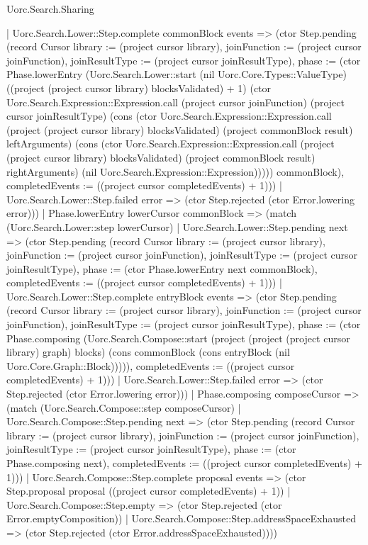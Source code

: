 \begin{lexlean}{Uorc.Search.Sharing}
\begin{semanticmodule}
{      | Uorc.Search.Lower::Step.complete commonBlock events => (ctor Step.pending (record Cursor {library := (project cursor library), joinFunction := (project cursor joinFunction), joinResultType := (project cursor joinResultType), phase := (ctor Phase.lowerEntry (Uorc.Search.Lower::start (nil Uorc.Core.Types::ValueType) ((project (project cursor library) blocksValidated) + 1) (ctor Uorc.Search.Expression::Expression.call (project cursor joinFunction) (project cursor joinResultType) (cons (ctor Uorc.Search.Expression::Expression.call (project (project cursor library) blocksValidated) (project commonBlock result) leftArguments) (cons (ctor Uorc.Search.Expression::Expression.call (project (project cursor library) blocksValidated) (project commonBlock result) rightArguments) (nil Uorc.Search.Expression::Expression))))) commonBlock), completedEvents := ((project cursor completedEvents) + 1)}))
      | Uorc.Search.Lower::Step.failed error => (ctor Step.rejected (ctor Error.lowering error)))
    | Phase.lowerEntry lowerCursor commonBlock => (match (Uorc.Search.Lower::step lowerCursor)
      | Uorc.Search.Lower::Step.pending next => (ctor Step.pending (record Cursor {library := (project cursor library), joinFunction := (project cursor joinFunction), joinResultType := (project cursor joinResultType), phase := (ctor Phase.lowerEntry next commonBlock), completedEvents := ((project cursor completedEvents) + 1)}))
      | Uorc.Search.Lower::Step.complete entryBlock events => (ctor Step.pending (record Cursor {library := (project cursor library), joinFunction := (project cursor joinFunction), joinResultType := (project cursor joinResultType), phase := (ctor Phase.composing (Uorc.Search.Compose::start (project (project (project cursor library) graph) blocks) (cons commonBlock (cons entryBlock (nil Uorc.Core.Graph::Block))))), completedEvents := ((project cursor completedEvents) + 1)}))
      | Uorc.Search.Lower::Step.failed error => (ctor Step.rejected (ctor Error.lowering error)))
    | Phase.composing composeCursor => (match (Uorc.Search.Compose::step composeCursor)
      | Uorc.Search.Compose::Step.pending next => (ctor Step.pending (record Cursor {library := (project cursor library), joinFunction := (project cursor joinFunction), joinResultType := (project cursor joinResultType), phase := (ctor Phase.composing next), completedEvents := ((project cursor completedEvents) + 1)}))
      | Uorc.Search.Compose::Step.complete proposal events => (ctor Step.proposal proposal ((project cursor completedEvents) + 1))
      | Uorc.Search.Compose::Step.empty => (ctor Step.rejected (ctor Error.emptyComposition))
      | Uorc.Search.Compose::Step.addressSpaceExhausted => (ctor Step.rejected (ctor Error.addressSpaceExhausted))))
}
\end{semanticmodule}
\end{lexlean}
